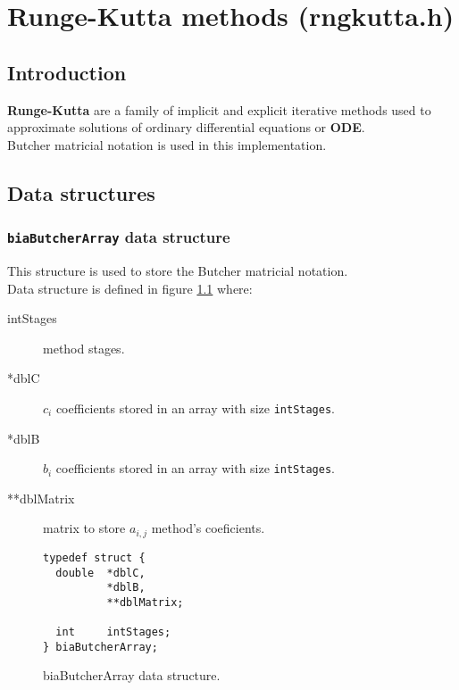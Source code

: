 %
%

\chapter{Runge-Kutta methods (rngkutta.h)}

\section{Introduction}

\textbf{Runge-Kutta} are a family of implicit and explicit iterative methods used to approximate solutions of ordinary differential equations or \textbf{ODE}.\\

Butcher matricial notation is used in this implementation.\\

\section{Data structures}

\subsection{\texttt{biaButcherArray} data structure} \label{sec:biaButcherArray}

This structure is used to store the Butcher matricial notation.\\

Data structure is defined in figure \ref{fig:biaButcherArray} where:
%
\begin{description}
%
\item[intStages] method stages.
%
\item[*dblC] $c_i$ coefficients stored in an array with size \texttt{intStages}.
%
\item[*dblB] $b_i$ coefficients stored in an array with size \texttt{intStages}.
%
\item[**dblMatrix] matrix to store $a_{i,j}$ method's coeficients.  
%
\end{description}

\begin{figure}[!h]
\begin{verbatim}
typedef struct {
  double  *dblC,
          *dblB,
          **dblMatrix;

  int     intStages;
} biaButcherArray;
\end{verbatim}
\caption{biaButcherArray data structure.} \label{fig:biaButcherArray}
\end{figure}
%
\FloatBarrier


